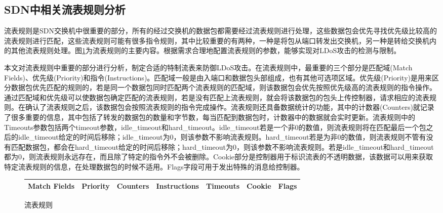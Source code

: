 \subsection{SDN中相关流表规则分析}
\label{chap4:flowruleanalysis}

流表规则是SDN交换机中很重要的部分，所有的经过交换机的数据包都需要经过流表规则进行处理，这些数据包会优先寻找优先级比较高的流表规则进行匹配，这些流表规则可能有很多指令规则，其中比较重要的有两种，一种是将包从端口转发出交换机，另一种是转给交换机内的其他流表规则处理。图\ref{figure:flowrule}为流表规则的主要内容。根据需求合理地配置流表规则的参数，能够实现对LDoS攻击的检测与限制。

本文对流表规则中重要的部分进行分析，制定合适的特制流表来防御LDoS攻击。在流表规则中，最重要的三个部分是匹配域(Match Fields)、优先级(Priority)和指令(Instructions)。匹配域一般是由入端口和数据包头部组成，也有其他可选项区域。优先级(Priority)是用来区分数据包优先匹配的规则的，若是同一个数据包同时匹配两个流表规则的匹配域，则该数据包会优先按照优先级高的流表规则的指令操作。通过匹配域和优先级可以使数据包确定匹配的流表规则，若是没有匹配上流表规则，就会将该数据包的包头上传控制器，请求相应的流表规则。在确认了流表规则之后，该数据包会按照流表规则的指令完成操作。流表规则还具备数据统计的功能，其中的计数器(Counters)就记录了很多重要的信息，其中包括了转发的数据包的数量和字节数，每当匹配到数据包时，计数器中的数据就会实时更新。流表规则中的Timeouts参数包括两个timeout参数，idle\_timeout和hard\_timeout。idle\_timeout若是一个非0的数值，则流表规则将在匹配最后一个包之后的idle\_timeout给定的时间后移除；idle\_timeout为0，则该参数不影响流表规则。hard\_timeout若是为非0的数值，则流表规则不管有没有匹配数据包，都会在hard\_timeout给定的时间后移除；hard\_timeout为0，则该参数不影响流表规则。若是idle\_timeout和hard\_timeout都为0，则流表规则永远存在，而且除了特定的指令外不会被删除。Cookie部分是控制器用于标识流表的不透明数据，该数据可以用来获取特定流表规则的信息，在处理数据包的时候不适用。Flags字段可用于发出特殊的消息给控制器。


\begin{figure}[htbp]
	\centering  %
	\begin{tabular}{|c|c|c|c|c|c|c|}  
		\hline  %
        Match Fields & Priority & Counters & Instructions & Timeouts & Cookie & Flags \\  %
        \hline		
	\end{tabular}
	\caption{流表规则}  %
	\label{figure:flowrule}  %
\end{figure}

